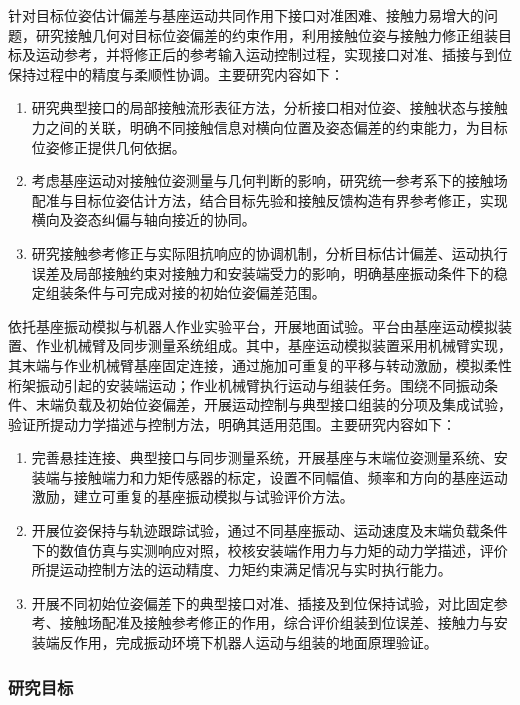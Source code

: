 针对目标位姿估计偏差与基座运动共同作用下接口对准困难、接触力易增大的问题，研究接触几何对目标位姿偏差的约束作用，利用接触位姿与接触力修正组装目标及运动参考，并将修正后的参考输入运动控制过程，实现接口对准、插接与到位保持过程中的精度与柔顺性协调。主要研究内容如下：
\begin{enumerate}[label=\arabic*)]
 \item 研究典型接口的局部接触流形表征方法，分析接口相对位姿、接触状态与接触力之间的关联，明确不同接触信息对横向位置及姿态偏差的约束能力，为目标位姿修正提供几何依据。
 \item 考虑基座运动对接触位姿测量与几何判断的影响，研究统一参考系下的接触场配准与目标位姿估计方法，结合目标先验和接触反馈构造有界参考修正，实现横向及姿态纠偏与轴向接近的协同。
 \item 研究接触参考修正与实际阻抗响应的协调机制，分析目标估计偏差、运动执行误差及局部接触约束对接触力和安装端受力的影响，明确基座振动条件下的稳定组装条件与可完成对接的初始位姿偏差范围。
\end{enumerate}


依托基座振动模拟与机器人作业实验平台，开展地面试验。平台由基座运动模拟装置、作业机械臂及同步测量系统组成。其中，基座运动模拟装置采用机械臂实现，其末端与作业机械臂基座固定连接，通过施加可重复的平移与转动激励，模拟柔性桁架振动引起的安装端运动；作业机械臂执行运动与组装任务。围绕不同振动条件、末端负载及初始位姿偏差，开展运动控制与典型接口组装的分项及集成试验，验证所提动力学描述与控制方法，明确其适用范围。主要研究内容如下：
\begin{enumerate}[label=\arabic*)]
 \item 完善悬挂连接、典型接口与同步测量系统，开展基座与末端位姿测量系统、安装端与接触端力和力矩传感器的标定，设置不同幅值、频率和方向的基座运动激励，建立可重复的基座振动模拟与试验评价方法。
 \item 开展位姿保持与轨迹跟踪试验，通过不同基座振动、运动速度及末端负载条件下的数值仿真与实测响应对照，校核安装端作用力与力矩的动力学描述，评价所提运动控制方法的运动精度、力矩约束满足情况与实时执行能力。
 \item 开展不同初始位姿偏差下的典型接口对准、插接及到位保持试验，对比固定参考、接触场配准及接触参考修正的作用，综合评价组装到位误差、接触力与安装端反作用，完成振动环境下机器人运动与组装的地面原理验证。
\end{enumerate}

\subsubsection{研究目标}

